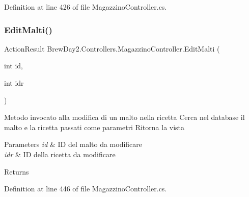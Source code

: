 Definition at line 426 of file Magazzino\+Controller.\+cs.

\mbox{\label{class_brew_day2_1_1_controllers_1_1_magazzino_controller_a591ba03e7b1d7ab34171e3f84ac15a19}} 
\subsubsection{\texorpdfstring{Edit\+Malti()}{EditMalti()}\hspace{0.1cm}{\footnotesize\ttfamily [1/2]}}
{\footnotesize\ttfamily Action\+Result Brew\+Day2.\+Controllers.\+Magazzino\+Controller.\+Edit\+Malti (\begin{DoxyParamCaption}\item[{int}]{id,  }\item[{int}]{idr }\end{DoxyParamCaption})}



Metodo invocato alla modifica di un malto nella ricetta Cerca nel database il malto e la ricetta passati come parametri Ritorna la vista 


\begin{DoxyParams}{Parameters}
{\em id} & ID del malto da modificare\\
\hline
{\em idr} & ID della ricetta da modificare\\
\hline
\end{DoxyParams}
\begin{DoxyReturn}{Returns}

\end{DoxyReturn}


Definition at line 446 of file Magazzino\+Controller.\+cs.

\mbox{\label{class_brew_day2_1_1_controllers_1_1_magazzino_controller_a898f64cc8e955db12ca1f12ed288b67b}} 
